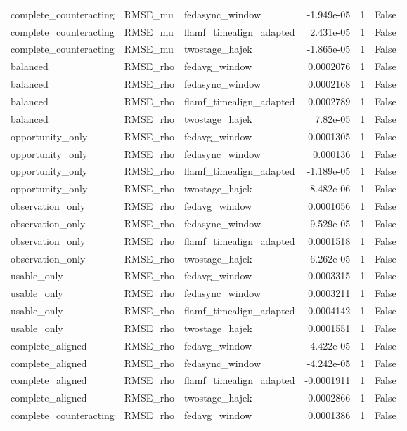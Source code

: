 \begin{table}
\begin{tabular}{lllrrr}
complete_counteracting & RMSE_mu & fedasync_window & -1.949e-05 & 1 & False \\
complete_counteracting & RMSE_mu & flamf_timealign_adapted & 2.431e-05 & 1 & False \\
complete_counteracting & RMSE_mu & twostage_hajek & -1.865e-05 & 1 & False \\
balanced & RMSE_rho & fedavg_window & 0.0002076 & 1 & False \\
balanced & RMSE_rho & fedasync_window & 0.0002168 & 1 & False \\
balanced & RMSE_rho & flamf_timealign_adapted & 0.0002789 & 1 & False \\
balanced & RMSE_rho & twostage_hajek & 7.82e-05 & 1 & False \\
opportunity_only & RMSE_rho & fedavg_window & 0.0001305 & 1 & False \\
opportunity_only & RMSE_rho & fedasync_window & 0.000136 & 1 & False \\
opportunity_only & RMSE_rho & flamf_timealign_adapted & -1.189e-05 & 1 & False \\
opportunity_only & RMSE_rho & twostage_hajek & 8.482e-06 & 1 & False \\
observation_only & RMSE_rho & fedavg_window & 0.0001056 & 1 & False \\
observation_only & RMSE_rho & fedasync_window & 9.529e-05 & 1 & False \\
observation_only & RMSE_rho & flamf_timealign_adapted & 0.0001518 & 1 & False \\
observation_only & RMSE_rho & twostage_hajek & 6.262e-05 & 1 & False \\
usable_only & RMSE_rho & fedavg_window & 0.0003315 & 1 & False \\
usable_only & RMSE_rho & fedasync_window & 0.0003211 & 1 & False \\
usable_only & RMSE_rho & flamf_timealign_adapted & 0.0004142 & 1 & False \\
usable_only & RMSE_rho & twostage_hajek & 0.0001551 & 1 & False \\
complete_aligned & RMSE_rho & fedavg_window & -4.422e-05 & 1 & False \\
complete_aligned & RMSE_rho & fedasync_window & -4.242e-05 & 1 & False \\
complete_aligned & RMSE_rho & flamf_timealign_adapted & -0.0001911 & 1 & False \\
complete_aligned & RMSE_rho & twostage_hajek & -0.0002866 & 1 & False \\
complete_counteracting & RMSE_rho & fedavg_window & 0.0001386 & 1 & False \\

\end{tabular}
\end{table}
